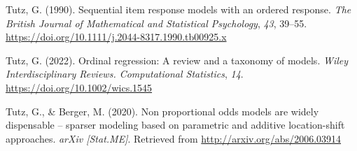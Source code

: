 \documentclass[
  man,floatsintext]{apa6}
\newlength{\cslhangindent}
\newenvironment{CSLReferences}[2] %
 {\begin{list}{}{%
  \setlength{\itemindent}{0pt}
  \setlength{\leftmargin}{0pt}
  \setlength{\parsep}{0pt}
  \ifodd #1
   \setlength{\leftmargin}{\cslhangindent}
   \setlength{\itemindent}{-1\cslhangindent}
  \fi
  \setlength{\itemsep}{#2\baselineskip}}}
 {\end{list}}
\begin{document}
\begin{CSLReferences}{1}{0}
Tutz, G. (1990). Sequential item response models with an ordered response. \emph{The British Journal of Mathematical and Statistical Psychology}, \emph{43}, 39--55. \url{https://doi.org/10.1111/j.2044-8317.1990.tb00925.x}

Tutz, G. (2022). Ordinal regression: A review and a taxonomy of models. \emph{Wiley Interdisciplinary Reviews. Computational Statistics}, \emph{14}. \url{https://doi.org/10.1002/wics.1545}

Tutz, G., \& Berger, M. (2020). Non proportional odds models are widely dispensable -- sparser modeling based on parametric and additive location-shift approaches. \emph{arXiv {[}Stat.ME{]}}. Retrieved from \url{http://arxiv.org/abs/2006.03914}

\end{CSLReferences}
\end{document}
